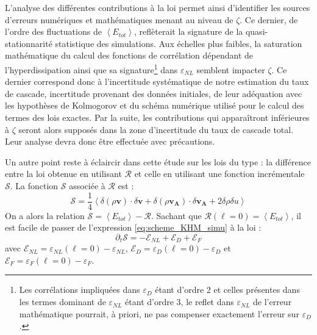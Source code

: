  L'analyse des différentes contributions à la loi  permet ainsi d'identifier les sources d'erreurs numériques et mathématiques menant au niveau de $\zeta$. Ce dernier, de l'ordre des fluctuations de $\left< E_{tot}\right>$, reflèterait la signature de la quasi-stationnarité statistique des simulations. Aux échelles plus faibles, la saturation mathématique du calcul des fonctions de corrélation dépendant de l'hyperdissipation ainsi que sa signature\footnote{Les corrélations impliquées dans $\varepsilon_{D}$ étant d'ordre 2 et celles présentes dans les termes dominant de $\varepsilon_{NL}$ étant d'ordre 3, le reflet dans $\varepsilon_{NL}$ de l'erreur mathématique pourrait, à priori, ne pas compenser exactement l'erreur sur $\varepsilon_{D}$. } dans $\varepsilon_{NL}$ semblent impacter $\zeta$. Ce dernier correspond donc à l'incertitude systématique de notre estimation du taux de cascade, incertitude provenant des données initiales, de leur adéquation avec les hypothèses de Kolmogorov et du schéma numérique utilisé pour le calcul des termes des lois exactes. Par la suite, les contributions qui apparaîtront inférieures à $\zeta$ seront alors supposés dans la zone d'incertitude du taux de cascade total. Leur analyse devra donc être effectuée avec précautions. 
 
 Un autre point reste à éclaircir dans cette étude sur les lois du type  : la différence entre la loi obtenue en utilisant $\mathcal{R}$ et celle en utilisant une fonction incrémentale $\mathcal{S}$. La fonction $\mathcal{S}$ associée à $\mathcal{R}$ est :
 \begin{equation}
    \label{eq:scheme_khms} \mathcal{S} = \frac{1}{4} \left< \delta (\rho \boldsymbol{v}) \cdot \delta \boldsymbol{v} + \delta (\rho \boldsymbol{v_A}) \cdot \delta \boldsymbol{v_A}  + 2 \delta \rho \delta u \right>
 \end{equation}
 On a alors la relation $\mathcal{S} = \left<E_{tot}\right> - \mathcal{R}$. Sachant que $\mathcal{R}(\boldsymbol{\ell} = 0) = \left<E_{tot}\right>$, il est facile de passer de l'expression \eqref{eq:scheme_KHM_simu} à la loi :
 \begin{equation}
  \label{eq:scheme_KHMS_simu}   \partial_t \mathcal{S} = - \mathcal{E}_{NL} + \mathcal{E}_{D} + \mathcal{E}_{F}
 \end{equation}
 avec $\mathcal{E}_{NL} = \varepsilon_{NL}(\boldsymbol{\ell} = 0) - \varepsilon_{NL}$, $\mathcal{E}_{D} = \varepsilon_{D}(\boldsymbol{\ell} = 0) - \varepsilon_{D}$ et $\mathcal{E}_{F} = \varepsilon_{F}(\boldsymbol{\ell} = 0) - \varepsilon_{F}$. 
 
